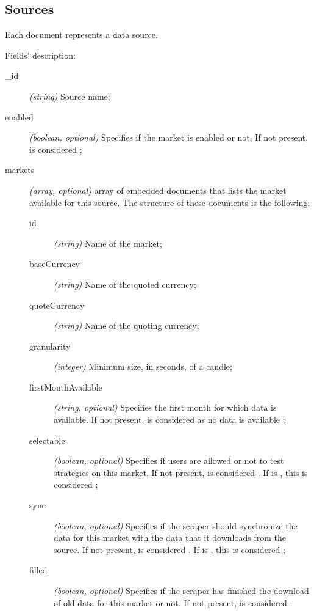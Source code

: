 \subsection{Sources}



Each document represents a data source.

Fields' description:
\begin{description}
	\item[\_id] \textit{(string)} Source name;
	\item[enabled] \textit{(boolean, optional)} Specifies if the market is
		enabled or not. If not present, is considered ;
	\item[markets] \textit{(array, optional)} array of embedded documents
		that lists the market available for this source. The structure
		of these documents is the following:
		\begin{description}
			\item[id] \textit{(string)} Name of the market;
			\item[baseCurrency] \textit{(string)} Name of the quoted
				currency;
			\item[quoteCurrency] \textit{(string)} Name of the
				quoting currency;
			\item[granularity] \textit{(integer)} Minimum size,
				in seconds, of a candle;
			\item[firstMonthAvailable] \textit{(string, optional)}
				Specifies the first month for which data is
				available. If not present, is considered as no
				data is available ;
			\item[selectable] \textit{(boolean, optional)} Specifies
				if users are allowed or not to test strategies
				on this market. If not present, is considered
				. If  is ,
				this is considered ;
			\item[sync] \textit{(boolean, optional)} Specifies if
				the scraper should synchronize the data for this
				market with the data that it downloads from the
				source. If not present, is considered
				. If  is ,
				this is considered ;
			\item[filled] \textit{(boolean, optional)} Specifies if
				the scraper has finished the download of old
				data for this market or not. If not present, is
				considered .
		\end{description}
\end{description}


